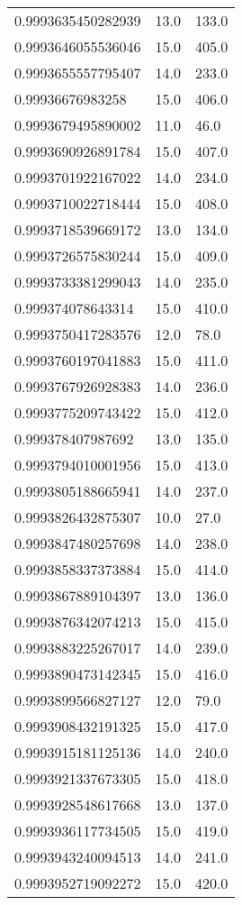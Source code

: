 \begin{center}
\begin{supertabular}[H]{p{0.30\textwidth}p{0.05\textwidth}p{0.05\textwidth}}
0.9993635450282939 & 13.0 & 133.0 \\ 
0.9993646055536046 & 15.0 & 405.0 \\ 
0.9993655557795407 & 14.0 & 233.0 \\ 
0.99936676983258 & 15.0 & 406.0 \\ 
0.9993679495890002 & 11.0 & 46.0 \\ 
0.9993690926891784 & 15.0 & 407.0 \\ 
0.9993701922167022 & 14.0 & 234.0 \\ 
0.9993710022718444 & 15.0 & 408.0 \\ 
0.9993718539669172 & 13.0 & 134.0 \\ 
0.9993726575830244 & 15.0 & 409.0 \\ 
0.9993733381299043 & 14.0 & 235.0 \\ 
0.999374078643314 & 15.0 & 410.0 \\ 
0.9993750417283576 & 12.0 & 78.0 \\ 
0.9993760197041883 & 15.0 & 411.0 \\ 
0.9993767926928383 & 14.0 & 236.0 \\ 
0.9993775209743422 & 15.0 & 412.0 \\ 
0.999378407987692 & 13.0 & 135.0 \\ 
0.9993794010001956 & 15.0 & 413.0 \\ 
0.9993805188665941 & 14.0 & 237.0 \\ 
0.9993826432875307 & 10.0 & 27.0 \\ 
0.9993847480257698 & 14.0 & 238.0 \\ 
0.9993858337373884 & 15.0 & 414.0 \\ 
0.9993867889104397 & 13.0 & 136.0 \\ 
0.9993876342074213 & 15.0 & 415.0 \\ 
0.9993883225267017 & 14.0 & 239.0 \\ 
0.9993890473142345 & 15.0 & 416.0 \\ 
0.9993899566827127 & 12.0 & 79.0 \\ 
0.9993908432191325 & 15.0 & 417.0 \\ 
0.9993915181125136 & 14.0 & 240.0 \\ 
0.9993921337673305 & 15.0 & 418.0 \\ 
0.9993928548617668 & 13.0 & 137.0 \\ 
0.9993936117734505 & 15.0 & 419.0 \\ 
0.9993943240094513 & 14.0 & 241.0 \\ 
0.9993952719092272 & 15.0 & 420.0 \\ 

\end{supertabular}
\end{center}
